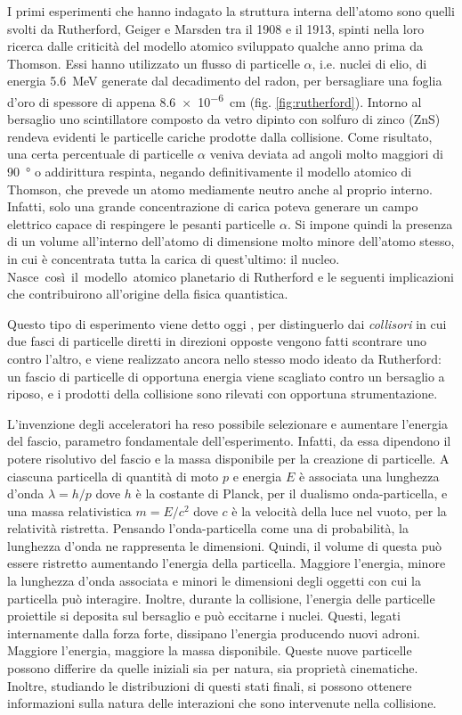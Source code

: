 \documentclass[../main.tex]{subfiles}
\begin{document}
I primi esperimenti che hanno indagato la struttura interna dell'atomo sono quelli svolti da Rutherford, Geiger e Marsden tra il 1908 e il 1913, spinti nella loro ricerca dalle criticità del modello atomico sviluppato qualche anno prima da Thomson. Essi hanno utilizzato un flusso di particelle $\alpha$, i.e. nuclei di elio, di energia \SI{5.6}{\MeV} generate dal decadimento del radon, per bersagliare una foglia d'oro di spessore di appena \SI{8.6e-6}{\cm} (fig. \ref{fig:rutherford}). Intorno al bersaglio uno scintillatore composto da vetro dipinto con solfuro di zinco (ZnS) rendeva evidenti le particelle cariche prodotte dalla collisione. Come risultato, una certa percentuale di particelle $\alpha$ veniva deviata ad angoli molto maggiori di \SI{90}{°} o addirittura respinta, negando definitivamente il modello atomico di Thomson, che prevede un atomo mediamente neutro anche al proprio interno. Infatti, solo una grande concentrazione di carica poteva generare un campo elettrico capace di respingere le pesanti particelle $\alpha$. Si impone quindi la presenza di un volume all'interno dell'atomo di dimensione molto minore dell'atomo stesso, in cui è concentrata tutta la carica di quest'ultimo: il nucleo. \mbox{Nasce così il modello atomico} planetario di Rutherford e le seguenti implicazioni che contribuirono all'origine della fisica quantistica.

Questo tipo di esperimento viene detto oggi , per distinguerlo dai \emph{collisori} in cui due fasci di particelle diretti in direzioni opposte vengono fatti scontrare uno contro l'altro, e viene realizzato ancora nello stesso modo ideato da Rutherford: un fascio di particelle di opportuna energia viene scagliato contro un bersaglio a riposo, e i prodotti della collisione sono rilevati con opportuna strumentazione.

L'invenzione degli acceleratori ha reso possibile selezionare e aumentare l'energia del fascio, parametro fondamentale dell'esperimento.
Infatti, da essa dipendono il potere risolutivo del fascio e la massa disponibile per la creazione di particelle.
A ciascuna particella di quantità di moto $p$ e energia $E$ è associata una lunghezza d'onda $\lambda = h / p $ dove $h$ è la costante di Planck, per il dualismo onda-particella, e una massa relativistica $m = E / c^2$ dove $c$ è la velocità della luce nel vuoto, per la relatività ristretta. 
Pensando l'onda-particella come una  di probabilità, la lunghezza d'onda ne rappresenta le dimensioni. Quindi, il volume di questa  può essere ristretto aumentando l'energia della particella. Maggiore l'energia, minore la lunghezza d'onda associata e minori le dimensioni degli oggetti con cui la particella può interagire. Inoltre, durante la collisione, l'energia delle particelle proiettile si deposita sul bersaglio e può eccitarne i nuclei. Questi, legati internamente dalla forza forte, dissipano l'energia producendo nuovi adroni. Maggiore l'energia, maggiore la massa disponibile.
Queste nuove particelle possono differire da quelle iniziali sia per natura, sia proprietà cinematiche. Inoltre, studiando le distribuzioni di questi stati finali, si possono ottenere informazioni sulla natura delle interazioni che sono intervenute nella collisione.
\end{document}
